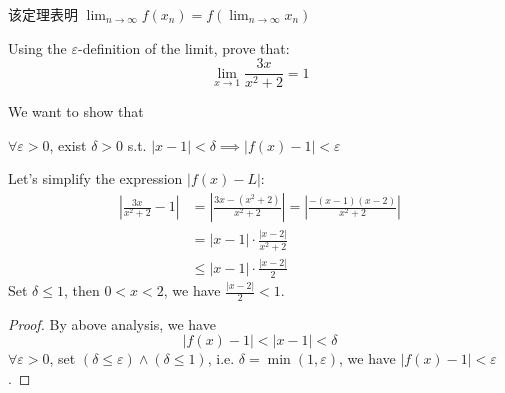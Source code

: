 \documentclass[
	UTF-8,
	11pt, %
	a4paper, %
]{LegrandOrangeBook}
\begin{document}
    \begin{remark}
        该定理表明 $\displaystyle\lim_{n \to \infty} f(x_n) = f(\lim_{n \to \infty} x_n)$
    \end{remark}

    \newpage

    \begin{example}
    Using the $\varepsilon$-definition of the limit, prove that:
    \[ \lim_{x \to 1} \frac{3x}{x^2+2} = 1 \]

    \begin{analysis}
        We want to show that 
        \begin{center}
            $\forall \varepsilon > 0$, 
            exist $\delta > 0$ s.t. $|x-1|<\delta \implies |f(x) - 1|<\varepsilon$
        \end{center}
        Let's simplify the expression $|f(x) - L|$:
        $$
        \begin{aligned}
        \left| \frac{3x}{x^2+2} - 1 \right| 
        &= \left| \frac{3x - (x^2+2)}{x^2+2} \right| 
        = \left| \frac{-(x-1)(x-2)}{x^2+2} \right| \\
        &= |x-1| \cdot \frac{|x-2|}{x^2+2} \\
        & \leq |x-1| \cdot \frac{|x-2|}{2} 
        \end{aligned}
        $$
        Set $\delta \leq 1$, then $0<x<2$, we have $\frac{|x-2|}{2} < 1$.
    \end{analysis}

    \begin{proof}
        By above analysis, we have
        $$
            |f(x) - 1| < |x-1| < \delta
        $$
        $\forall \varepsilon > 0$, 
        set $(\delta \leq \varepsilon) \land (\delta \leq 1)$, i.e. $\delta = \min(1,\varepsilon)$, 
        we have $|f(x) - 1| < \varepsilon$.
    \end{proof}

    \end{example}
\end{document}
